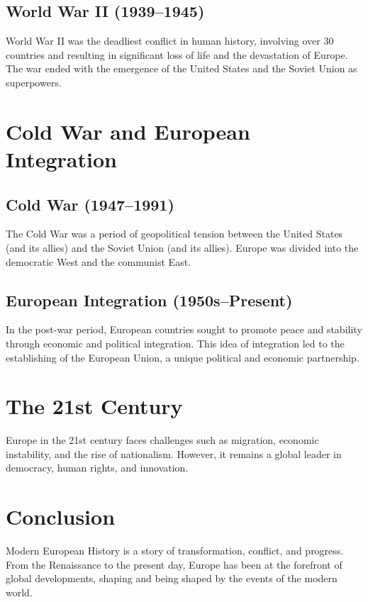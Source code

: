 \documentclass[a4paper,12pt]{book}
\begin{document}
\subsection{World War II (1939–1945)}
World War II was the deadliest conflict in human history, involving over 30 countries and resulting in significant loss of life and the devastation of Europe. The war ended with the emergence of the United States and the Soviet Union as superpowers.

\section{Cold War and European Integration}
\label{sec:cold-war-european-integration}
\subsection{Cold War (1947–1991)}
The Cold War was a period of geopolitical tension between the United States (and its allies) and the Soviet Union (and its allies). Europe was divided into the democratic West and the communist East.

\subsection{European Integration (1950s–Present)}
In the post-war period, European countries sought to promote peace and stability through economic and political integration. This idea of integration led to the establishing of the European Union, a unique political and economic partnership.

\section{The 21st Century}
\label{sec:21st-century-europe}
Europe in the 21st century faces challenges such as migration, economic instability, and the rise of nationalism. However, it remains a global leader in democracy, human rights, and innovation.

\section{Conclusion}
\label{sec:conclusion-modern-europe}
Modern European History is a story of transformation, conflict, and progress. From the Renaissance to the present day, Europe has been at the forefront of global developments, shaping and being shaped by the events of the modern world.
\end{document}
